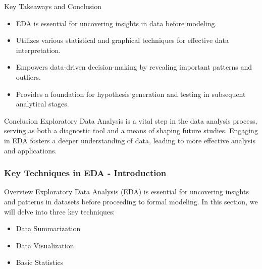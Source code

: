 \documentclass[aspectratio=169]{beamer}
\begin{document}
\begin{frame}[fragile]{Key Takeaways and Conclusion}
    \begin{itemize}
        \item EDA is essential for uncovering insights in data before modeling.
        \item Utilizes various statistical and graphical techniques for effective data interpretation.
        \item Empowers data-driven decision-making by revealing important patterns and outliers.
        \item Provides a foundation for hypothesis generation and testing in subsequent analytical stages.
    \end{itemize}
    
    \begin{block}{Conclusion}
        Exploratory Data Analysis is a vital step in the data analysis process, serving as both a diagnostic tool and a means of shaping future studies. Engaging in EDA fosters a deeper understanding of data, leading to more effective analysis and applications.
    \end{block}
\end{frame}

\begin{frame}[fragile]
    \frametitle{Key Techniques in EDA - Introduction}
    \begin{block}{Overview}
        Exploratory Data Analysis (EDA) is essential for uncovering insights and patterns in datasets before proceeding to formal modeling. In this section, we will delve into three key techniques:
        \begin{itemize}
            \item Data Summarization
            \item Data Visualization
            \item Basic Statistics
        \end{itemize}
    \end{block}
\end{frame}
\end{document}
